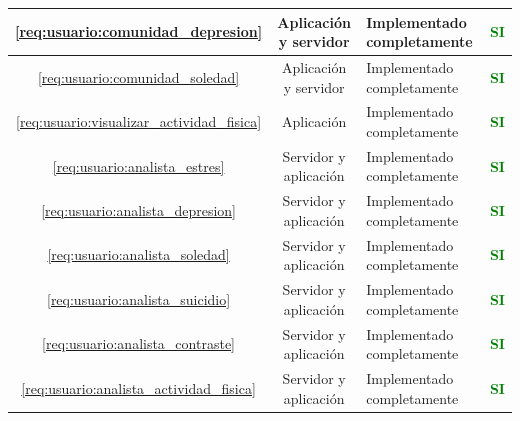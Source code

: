 \begin{xltabular}{\textwidth}{|c|c|X|c|}
        \hline
        \ref{req:usuario:comunidad_depresion} & Aplicación y servidor & Implementado completamente & \textcolor{green}{\textbf{SI}} \\
        \hline
        \ref{req:usuario:comunidad_soledad} & Aplicación y servidor & Implementado completamente & \textcolor{green}{\textbf{SI}} \\
        \hline
        \ref{req:usuario:visualizar_actividad_fisica} & Aplicación & Implementado completamente & \textcolor{green}{\textbf{SI}} \\
        \hline
        \ref{req:usuario:analista_estres} & Servidor y aplicación & Implementado completamente & \textcolor{green}{\textbf{SI}} \\
        \hline
        \ref{req:usuario:analista_depresion} & Servidor y aplicación & Implementado completamente & \textcolor{green}{\textbf{SI}} \\
        \hline
        \ref{req:usuario:analista_soledad} & Servidor y aplicación & Implementado completamente & \textcolor{green}{\textbf{SI}} \\
        \hline
        \ref{req:usuario:analista_suicidio} & Servidor y aplicación & Implementado completamente & \textcolor{green}{\textbf{SI}} \\
        \hline
        \ref{req:usuario:analista_contraste} & Servidor y aplicación & Implementado completamente & \textcolor{green}{\textbf{SI}} \\
        \hline
        \ref{req:usuario:analista_actividad_fisica} & Servidor y aplicación & Implementado completamente & \textcolor{green}{\textbf{SI}} \\
    \end{xltabular}

